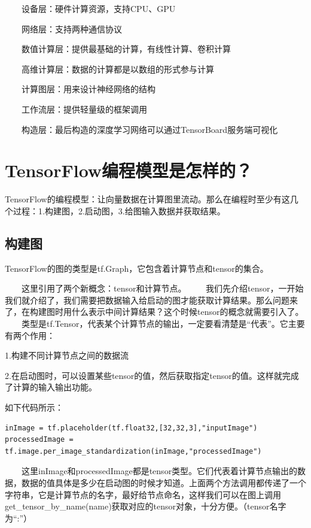   设备层：硬件计算资源，支持CPU、GPU

  网络层：支持两种通信协议

  数值计算层：提供最基础的计算，有线性计算、卷积计算

  高维计算层：数据的计算都是以数组的形式参与计算

  计算图层：用来设计神经网络的结构

  工作流层：提供轻量级的框架调用

  构造层：最后构造的深度学习网络可以通过TensorBoard服务端可视化

\section{TensorFlow编程模型是怎样的？}\label{tensorflowux7f16ux7a0bux6a21ux578bux662fux600eux6837ux7684}

TensorFlow的编程模型：让向量数据在计算图里流动。那么在编程时至少有这几个过程：1.构建图，2.启动图，3.给图输入数据并获取结果。

\subsection{构建图}\label{ux6784ux5efaux56fe}

TensorFlow的图的类型是tf.Graph，它包含着计算节点和tensor的集合。

  这里引用了两个新概念：tensor和计算节点。
  我们先介绍tensor，一开始我们就介绍了，我们需要把数据输入给启动的图才能获取计算结果。那么问题来了，在构建图时用什么表示中间计算结果？这个时候tensor的概念就需要引入了。
  类型是tf.Tensor，代表某个计算节点的输出，一定要看清楚是``代表''。它主要有两个作用：

1.构建不同计算节点之间的数据流

2.在启动图时，可以设置某些tensor的值，然后获取指定tensor的值。这样就完成了计算的输入输出功能。

如下代码所示：

\begin{verbatim}
inImage = tf.placeholder(tf.float32,[32,32,3],"inputImage")
processedImage = tf.image.per_image_standardization(inImage,"processedImage")
\end{verbatim}

  这里inImage和processedImage都是tensor类型。它们代表着计算节点输出的数据，数据的值具体是多少在启动图的时候才知道。上面两个方法调用都传递了一个字符串，它是计算节点的名字，最好给节点命名，这样我们可以在图上调用get\_tensor\_by\_name(name)获取对应的tensor对象，十分方便。（tensor名字为``:''）

